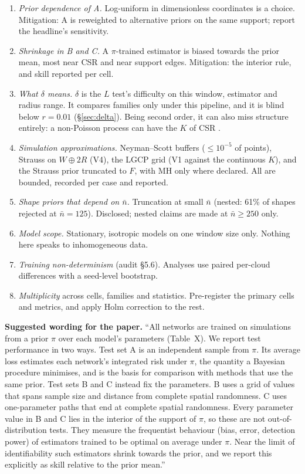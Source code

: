 \documentclass[10pt,a4paper]{article}
\newcommand{\nbar}{\bar n}
\newenvironment{keybox}{\par\smallskip\noindent\begin{lrbox}{\keyboxsave}\begin{minipage}{\dimexpr\linewidth-2\fboxsep-2\fboxrule\relax}\small\setlength{\parskip}{0.4em}}{\end{minipage}\end{lrbox}\fbox{\usebox{\keyboxsave}}\par\smallskip}
\begin{document}
\begin{enumerate}
  \item \emph{Prior dependence of A.} Log-uniform in dimensionless coordinates is a choice. Mitigation: A is reweighted to alternative priors on the same support; report the headline's sensitivity.
  \item \emph{Shrinkage in B and C.} A $\pi$-trained estimator is biased towards the prior mean, most near CSR and near support edges. Mitigation: the interior rule, and skill reported per cell.
  \item \emph{What $\delta$ means.} $\delta$ is the $L$ test's difficulty on this window, estimator and radius range. It compares families only under this pipeline, and it is blind below $r=0.01$ (\S\ref{sec:delta}). Being second order, it can also miss structure entirely: a non-Poisson process can have the $K$ of CSR \citep{BaddeleySilverman1984}.
  \item \emph{Simulation approximations.} Neyman--Scott buffers ($\le10^{-5}$ of points), Strauss on $W\oplus2R$ (V4), the LGCP grid (V1 against the continuous $K$), and the Strauss prior truncated to $F$, with MH only where declared. All are bounded, recorded per case and reported.
  \item \emph{Shape priors that depend on $\nbar$.} Truncation at small $\nbar$ (nested: 61\% of shapes rejected at $\nbar=125$). Disclosed; nested claims are made at $\nbar\ge250$ only.
  \item \emph{Model scope.} Stationary, isotropic models on one window size only. Nothing here speaks to inhomogeneous data.
  \item \emph{Training non-determinism} (audit \S5.6). Analyses use paired per-cloud differences with a seed-level bootstrap.
  \item \emph{Multiplicity} across cells, families and statistics. Pre-register the primary cells and metrics, and apply Holm correction to the rest.
\end{enumerate}

\begin{keybox}
\textbf{Suggested wording for the paper.} ``All networks are trained on simulations from a prior $\pi$ over each model's parameters (Table~X). We report test performance in two ways. Test set A is an independent sample from $\pi$. Its average loss estimates each network's integrated risk under $\pi$, the quantity a Bayesian procedure minimises, and is the basis for comparison with methods that use the same prior. Test sets B and C instead fix the parameters. B uses a grid of values that spans sample size and distance from complete spatial randomness. C uses one-parameter paths that end at complete spatial randomness. Every parameter value in B and C lies in the interior of the support of $\pi$, so these are not out-of-distribution tests. They measure the frequentist behaviour (bias, error, detection power) of estimators trained to be optimal on average under $\pi$. Near the limit of identifiability such estimators shrink towards the prior, and we report this explicitly as skill relative to the prior mean.''
\end{keybox}
\end{document}
